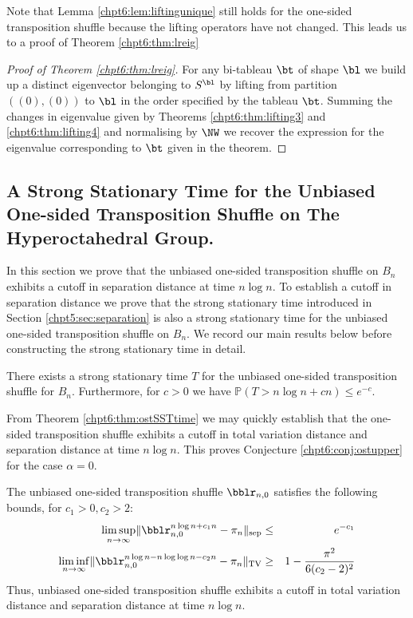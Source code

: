 \documentclass[11pt]{report}
\begin{document}
Note that Lemma \ref{chpt6:lem:liftingunique} still holds for the one-sided transposition shuffle because the lifting operators have not changed. This leads us to a proof of Theorem \ref{chpt6:thm:lreig}

\begin{proof}[Proof of Theorem \ref{chpt6:thm:lreig}]
	For any bi-tableau $\bt$ of shape $\bl$ we build up a distinct eigenvector belonging to $S^{\bl}$ by lifting from partition $((0),(0))$ to $\bl$ in the order specified by the tableau $\bt$. Summing the changes in eigenvalue given by Theorems \ref{chpt6:thm:lifting3} and \ref{chpt6:thm:lifting4} and normalising by $\NW$ we recover the expression for the eigenvalue corresponding to $\bt$ given in the theorem.
\end{proof}






\subsection{A Strong Stationary Time for the Unbiased One-sided Transposition Shuffle on The Hyperoctahedral Group.}
\label{chpt6:subsec:ostsst}
In this section we prove that the unbiased one-sided transposition shuffle on $B_{n}$ exhibits a cutoff in separation distance at time $n\log n$.	To establish a cutoff in separation distance we prove that the strong stationary time introduced in Section \ref{chpt5:sec:separation} is also a strong stationary time for the unbiased one-sided transposition shuffle on $B_{n}$. We record our main results below before constructing the strong stationary time in detail.



\begin{thm}
	\label{chpt6:thm:ostSSTtime}
	There exists a strong stationary time $T$ for the unbiased one-sided 
	transposition shuffle for $B_{n}$. Furthermore, for $c>0$ we have	$\mathbb{P}(T> n\log n + cn) \leq e^{-c}$.
\end{thm}

From Theorem \ref{chpt6:thm:ostSSTtime} we may quickly establish that the one-sided transposition shuffle exhibits a cutoff in total variation distance and separation distance at time $n\log n$. This proves Conjecture \ref{chpt6:conj:ostupper} for the case $\alpha=0$.


\begin{thm}
	\label{chpt6:thm:ostsepcutoff}
	The unbiased one-sided transposition shuffle $\bblr_{n,0}$ satisfies the following bounds, for $c_{1}>0, c_{2}>2$:
	\begin{eqnarray} 
	\limsup_{n\to\infty} \lVert \bblr_{n,0}^{n\log n +c_{1}n} 
	-\pi_{n} 	\rVert_{\textnormal{sep}} & \leq & e^{-c_{1}} \label{chpt5:eqn:sepupper}\\ 
	\liminf_{n\to\infty} \lVert \bblr_{n,0}^{n\log n -n \log \log n - c_{2}n} 
	-\pi_{n} 	\rVert_{\tiny \textnormal{TV}} & \geq & 1 -\frac{\pi^{2}}{6(c_{2}-2)^{2}} \label{chpt5:eqn:seplower}
	\end{eqnarray}
	Thus, unbiased one-sided transposition shuffle exhibits a cutoff in total variation distance and separation distance at 	time $n\log n$.
\end{thm}
\end{document}
